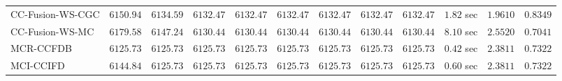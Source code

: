 \begin{table}[H]
\begin{tabular}{lrrrrrrrrrrr}
    CC-Fusion-WS-CGC & $      6150.94$ & $      6134.59$ & $      6132.47$ & $      6132.47$ & $      6132.47$ & $      6132.47$ & $      6132.47$ & $      6132.47$ & $         1.82$ sec    & $       1.9610$  & $       0.8349$ \\ 
     CC-Fusion-WS-MC & $      6179.58$ & $      6147.24$ & $      6130.44$ & $      6130.44$ & $      6130.44$ & $      6130.44$ & $      6130.44$ & $      6130.44$ & $         8.10$ sec    & $       2.5520$  & $       0.7041$ \\ 
\cmidrule{1-1} 
           MCR-CCFDB & $      6125.73$ & $      6125.73$ & $      6125.73$ & $      6125.73$ & $      6125.73$ & $      6125.73$ & $      6125.73$ & $      6125.73$ & $         0.42$ sec    & $       2.3811$  & $       0.7322$ \\ 
\cmidrule{1-1} 
           MCI-CCIFD & $      6144.84$ & $      6125.73$ & $      6125.73$ & $      6125.73$ & $      6125.73$ & $      6125.73$ & $      6125.73$ & $      6125.73$ & $         0.60$ sec    & $       2.3811$  & $       0.7322$ \\ 
\bottomrule
\end{tabular}
\end{table}

